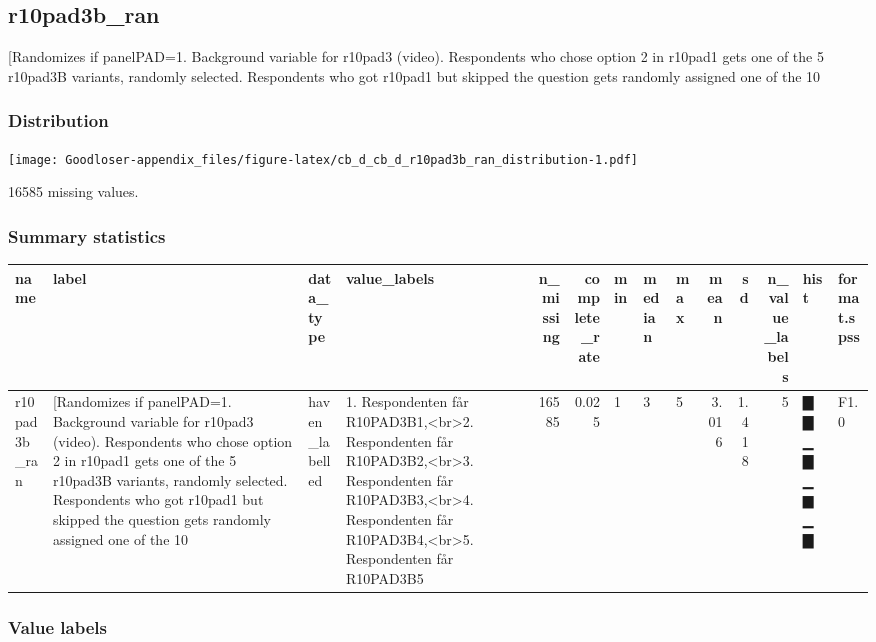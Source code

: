 \documentclass[
]{book}
\begin{document}
\hypertarget{r10pad3b_ran}{%
\subsection{r10pad3b\_ran}\label{r10pad3b_ran}}

{[}Randomizes if panelPAD=1. Background variable for r10pad3 (video). Respondents who chose option 2 in r10pad1 gets one of the 5 r10pad3B variants, randomly selected. Respondents who got r10pad1 but skipped the question gets randomly assigned one of the 10

\hypertarget{r10pad3b_ran_distribution}{%
\subsubsection{Distribution}\label{r10pad3b_ran_distribution}}

\texttt{[image: Goodloser-appendix\_files/figure-latex/cb\_d\_cb\_d\_r10pad3b\_ran\_distribution-1.pdf]}

16585 missing values.

\hypertarget{r10pad3b_ran_summary}{%
\subsubsection{Summary statistics}\label{r10pad3b_ran_summary}}

\begin{tabular}{l|l|l|l|r|r|l|l|l|r|r|r|l|l}
\hline
name & label & data_type & value_labels & n_missing & complete_rate & min & median & max & mean & sd & n_value_labels & hist & format.spss\\
\hline
r10pad3b_ran & [Randomizes if panelPAD=1. Background variable for r10pad3 (video). Respondents who chose option 2 in r10pad1 gets one of the 5 r10pad3B variants, randomly selected. Respondents who got r10pad1 but skipped the question gets randomly assigned one of the 10 & haven_labelled & 1. Respondenten får R10PAD3B1,<br>2. Respondenten får R10PAD3B2,<br>3. Respondenten får R10PAD3B3,<br>4. Respondenten får R10PAD3B4,<br>5. Respondenten får R10PAD3B5 & 16585 & 0.025 & 1 & 3 & 5 & 3.016 & 1.418 & 5 & ▇▇▁▇▁▆▁▇ & F1.0\\
\hline
\end{tabular}

\hypertarget{r10pad3b_ran_labels}{%
\subsubsection{Value labels}\label{r10pad3b_ran_labels}}
\end{document}
